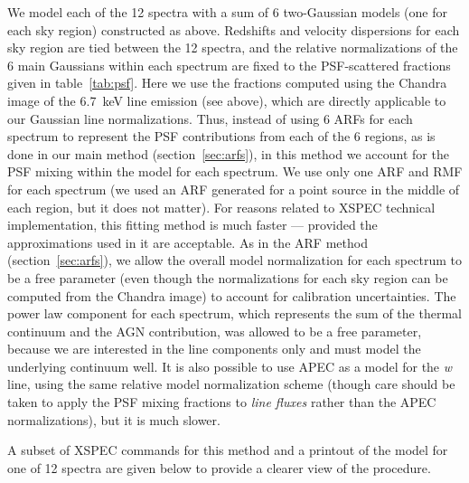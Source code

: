 We model each of the 12 spectra with a sum of 6 two-Gaussian models (one for each sky region) constructed as above. Redshifts and velocity dispersions for each sky region are tied between the 12 spectra, and the relative normalizations of the 6 main Gaussians within each spectrum are fixed to the PSF-scattered fractions given in table~\ref{tab:psf}. Here we use the fractions computed using the Chandra image of the 6.7~keV line emission (see above), which are directly applicable to our Gaussian line normalizations. Thus, instead of using 6 ARFs for each spectrum to represent the PSF contributions from each of the 6 regions, as is done in our main method (section~\ref{sec:arfs}), in this method we account for the PSF mixing within the model for each spectrum. We use only one ARF and RMF for each spectrum (we used an ARF generated for a point source in the middle of each region, but it does not matter). For reasons related to XSPEC technical implementation, this fitting method is much faster --- provided the approximations used in it are acceptable. As in the ARF method (section~\ref{sec:arfs}), we allow the overall model normalization for each spectrum to be a free parameter (even though the normalizations for each sky region can be computed from the Chandra image) to account for calibration uncertainties. The power law component for each spectrum, which represents the sum of the thermal continuum and the AGN contribution, was allowed to be a free parameter, because we are interested in the line components only and must model the underlying continuum well. It is also  possible to use APEC as a model for the {\it w} line, using the same relative model normalization scheme (though care should be taken to apply the PSF mixing fractions to {\it line fluxes} rather than the APEC normalizations), but it is much slower.

A subset of {\small XSPEC} commands for this method and a printout of the model for one of 12 spectra are given below to provide a clearer view of the procedure.

